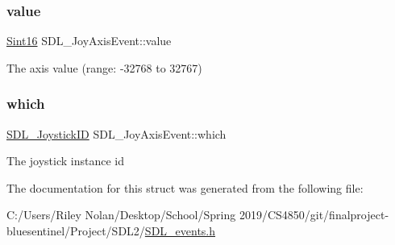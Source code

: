 \subsubsection{\texorpdfstring{value}{value}}
{\footnotesize\ttfamily \mbox{\hyperlink{_s_d_l__stdinc_8h_a9d0257032c0e146ab6121bf0122712f5}{Sint16}} S\+D\+L\+\_\+\+Joy\+Axis\+Event\+::value}

The axis value (range\+: -\/32768 to 32767) \mbox{\label{struct_s_d_l___joy_axis_event_a965719f4703a7091bcc5f07f79fcf7e1}} 
\subsubsection{\texorpdfstring{which}{which}}
{\footnotesize\ttfamily \mbox{\hyperlink{_s_d_l__joystick_8h_a3c3d32500cb08f76ee8077983912c0bd}{S\+D\+L\+\_\+\+Joystick\+ID}} S\+D\+L\+\_\+\+Joy\+Axis\+Event\+::which}

The joystick instance id 

The documentation for this struct was generated from the following file\+:\begin{DoxyCompactItemize}
\item 
C\+:/\+Users/\+Riley Nolan/\+Desktop/\+School/\+Spring 2019/\+C\+S4850/git/finalproject-\/bluesentinel/\+Project/\+S\+D\+L2/\mbox{\hyperlink{_s_d_l__events_8h}{S\+D\+L\+\_\+events.\+h}}\end{DoxyCompactItemize}
